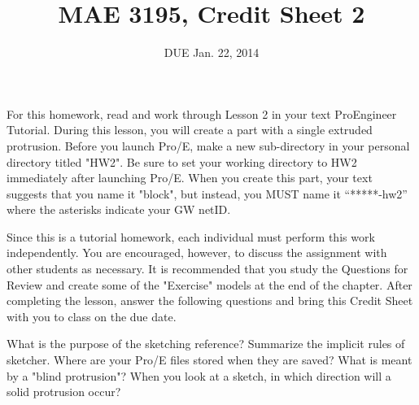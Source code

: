 \documentclass{homework}
\title{MAE 3195, Credit Sheet 2}
\author{DUE Jan. 22, 2014}
\begin{document}
For this homework, read and work through Lesson 2 in your text ProEngineer Tutorial. During this lesson, you will create a part with a single extruded protrusion. Before you launch Pro/E, make a new sub-directory in your personal directory titled "HW2". Be sure to set your working directory to HW2 immediately after launching Pro/E. When you create this part, your text suggests that you name it "block", but instead, you MUST name it “*****-hw2” where the asterisks indicate your GW netID.

Since this is a tutorial homework, each individual must perform this work independently. You are encouraged, however, to discuss the assignment with other students as necessary. It is recommended that you study the Questions for Review and create some of the "Exercise" models at the end of the chapter. After completing the lesson, answer the following questions and bring this Credit Sheet with you to class on the due date.

\problem{} What is the purpose of the sketching reference?
\solution 
\problem{} Summarize the implicit rules of sketcher.
\solution
\problem{} Where are your Pro/E files stored when they are saved?
\solution
\problem{} What is meant by a "blind protrusion"?
\solution
\problem{} When you look at a sketch, in which direction will a solid protrusion occur?
\solution
\end{document}

